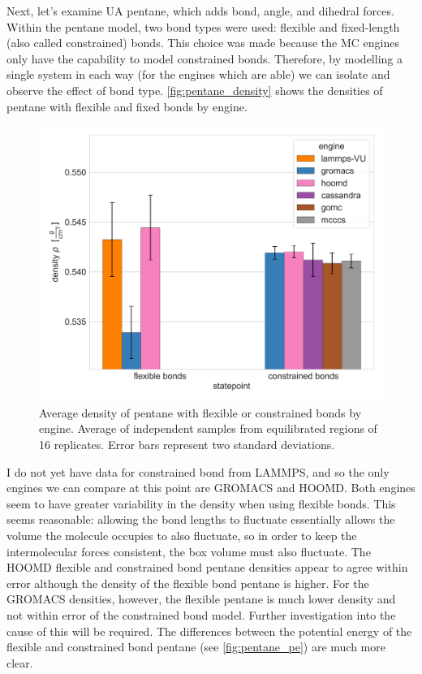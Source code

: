 Next, let's examine UA pentane, which adds bond, angle, and dihedral forces. 
Within the pentane model, two bond types were used: flexible and fixed-length (also called constrained) bonds.
This choice was made because the MC engines only have the capability to model constrained bonds. 
Therefore, by modelling a single system in each way (for the engines which are able) we can isolate and observe the effect of bond type.
\autoref{fig:pentane_density} shows the densities of pentane with flexible and fixed bonds by engine.
\begin{figure}[h!]
    \centering
    \includegraphics[width=0.8\linewidth,keepaspectratio]{figures/rep_study/pentane_summary.png}
    \caption{Average density of pentane with flexible or constrained bonds by engine. Average of independent samples from equilibrated regions of 16 replicates. Error bars represent two standard deviations.}\label{fig:pentane_density}
\end{figure}
I do not yet have data for constrained bond from LAMMPS, and so the only engines we can compare at this point are GROMACS and HOOMD.
Both engines seem to have greater variability in the density when using flexible bonds. 
This seems reasonable: allowing the bond lengths to fluctuate essentially allows the volume the molecule occupies to also fluctuate, so in order to keep the intermolecular forces consistent, the box volume must also fluctuate.
The HOOMD flexible and constrained bond pentane densities appear to agree within error although the density of the flexible bond pentane is higher.
For the GROMACS densities, however, the flexible pentane is much lower density and not within error of the constrained bond model.
Further investigation into the cause of this will be required.
The differences between the potential energy of the flexible and constrained bond pentane (see \autoref{fig:pentane_pe}) are much more clear.
